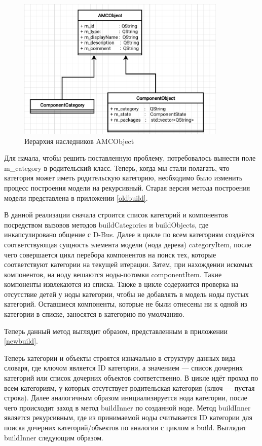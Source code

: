 \documentclass[bachelor, och, pract]{SCWorks}
\begin{document}
\begin{figure}[!ht]
	\centering
	\includegraphics[width=10cm]{amcobject.png}
	\caption{\label{fig:f3}%
	Иерархия наследников AMCObject}
\end{figure}

Для начала, чтобы решить поставленную проблему, потребовалось вынести поле m\_category в родительский класс.
Теперь, когда мы стали полагать, что категория может иметь родительскую категорию, необходимо было изменить процесс построения модели на рекурсивный.
Старая версия метода построения модели представлена в приложении \ref{oldbuild}.

В данной реализации сначала строится список категорий и компонентов посредством вызовов методов buildCategories и buildObjects, где инкапсулировано общение с D-Bus.
Далее в цикле по всем категориям создаётся соответствующая сущность элемента модели (нода дерева) categoryItem, после чего совершается цикл перебора компонентов на поиск тех, которые соответствуют категории на текущей итерации.
Затем, при нахождении искомых компонентов, на ноду вешаются ноды-потомки componentItem.
Такие компоненты извлекаются из списка.
Также в цикле содержится проверка на отсутствие детей у ноды категории, чтобы не добавлять в модель ноды пустых категорий.
Оставшиеся компоненты, которые не были отнесены ни к одной из категории в списке, заносятся в категорию по умолчанию.

Теперь данный метод выглядит образом, представленным в приложении \ref{newbuild}.

Теперь категории и объекты строятся изначально в структуру данных вида словаря, где ключом является ID категории, а значением --- список дочерних категорий или список дочерних объектов соответственно.
В цикле идёт проход по всем категориям, у которых отсутствует родительская категория (ключ --- пустая строка).
Далее аналогичным образом инициализируется нода категории, после чего происходит заход в метод buildInner по созданной ноде.
Метод buildInner является рекурсивным, где из принимаемой ноды считывается ID категории для поиска дочерних категорий/объектов по аналогии с циклом в build.
Выглядит buildInner следующим образом.
\end{document}
